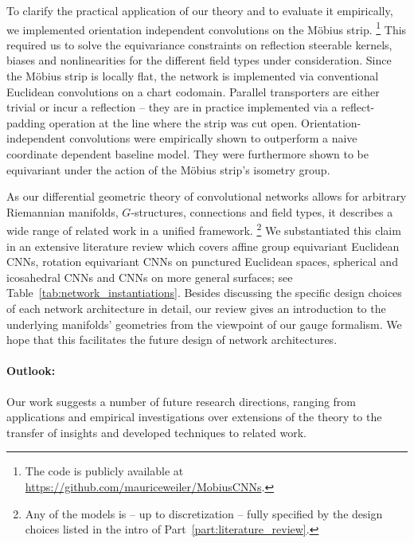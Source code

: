 To clarify the practical application of our theory and to evaluate it empirically, we implemented orientation independent convolutions on the M\"obius strip.%
\footnote{
    The code is publicly available at \url{https://github.com/mauriceweiler/MobiusCNNs}.
}
This required us to solve the equivariance constraints on reflection steerable kernels, biases and nonlinearities for the different field types under consideration.
Since the M\"obius strip is locally flat, the network is implemented via conventional Euclidean convolutions on a chart codomain.
Parallel transporters are either trivial or incur a reflection -- they are in practice implemented via a reflect-padding operation at the line where the strip was cut open.
Orientation-independent convolutions were empirically shown to outperform a naive coordinate dependent baseline model.
They were furthermore shown to be equivariant under the action of the M\"obius strip's isometry group.


As our differential geometric theory of convolutional networks allows for arbitrary Riemannian manifolds, $G$-structures, connections and field types, it describes a wide range of related work in a unified framework.%
\footnote{
    Any of the models is -- up to discretization -- fully specified by the design choices listed in the intro of Part~\ref{part:literature_review}.
}
We substantiated this claim in an extensive literature review which covers affine group equivariant Euclidean CNNs, rotation equivariant CNNs on punctured Euclidean spaces, spherical and icosahedral CNNs and CNNs on more general surfaces;
see Table~\ref{tab:network_instantiations}.
Besides discussing the specific design choices of each network architecture in detail, our review gives an introduction to the underlying manifolds' geometries from the viewpoint of our gauge formalism.
We hope that this facilitates the future design of network architectures.





\paragraph{Outlook:}

Our work suggests a number of future research directions, ranging from applications and empirical investigations over extensions of the theory to the transfer of insights and developed techniques to related work.


